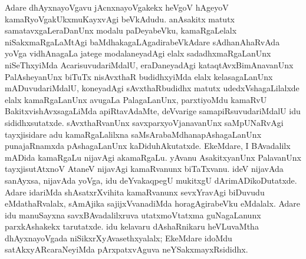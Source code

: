 Adare dhAyxnayoVgavu jAcnxnayoVgakekx heVgoV hAgeyoV kamaRyoVgakUkx\break muKayxvAgi beVkAdudu. anAsakitx matutx samatavxgaLeraDanUnx modalu paDeyabeVku, kamaRgaLelalx niSakxmaRgaLaMtAgi baMdhakagaLAgadirabeVkAdare sAdhanAhaRvAda yoVga vidhAnagaLa jatege modalaneyadAgi elalx sadadhxmaRgaLanUnx niSeThxyiMda Acarisuvu\-da\-riMdalU, eraDaneyadAgi kataqtAvxBimAnavanUnx PalAsheyanUnx biTuTx nisAvxthaR budidhx\-yiMda elalx kelasagaLanUnx mADuvudariMdalU, koneyadAgi sAvxthaRbudidhx matutx udedxVshagaLilalxde elalx kamaRgaLanUnx avugaLa PalagaLanUnx, parxtiyoMdu kamaRvU Bakitx\-vishAvxsagaLiMda apiRtavAdaMte, deVvarige samapiRsuvudariMdalU idu sididhxsutatxde. sAvxthaRvanUnx savxparxyoVjanavanUnx saMpUNaRvAgi tayxjisidare adu kamaRgaLalilxna saMsArabaMdhanapAshagaLanUnx punajaRnamxda pAshagaLanUnx kaDiduhAkutatxde. EkeMdare, I BAvadalilx mADida kamaRgaLu nijavAgi akamaRgaLu. yAvanu AsakitxyanUnx PalavanUnx tayxjisutAtxnoV AtaneV nijavAgi kamaRvanunx biTaTxvanu. ideV nijavAda sanAyxsa, nijavAda yoVga, idu deYvakaqpegU mukitxgU dArimADikoDutatxde. Adare idariMda shAsatxrXvihita kamaRvanunx sevxYravAgi biDuvudu eMdathaRvalalx, sAmAjika sajijxVvanadiMda horagAgirabeVku eMdalalx. Adare idu manuSayxna savxBAvadalilxruva utatxmoVtatxma guNagaLanunx parxkAshakekx tarutatxde. idu kelavaru dAshaRnikaru heVLuvaMtha dhAyxnayoVgada niSikxrXyAvasethxyalalx; EkeMdare idoMdu satAkxyARcaraNeyiMda pArxpatxvAguva neYSakxmayxRsididhx.

